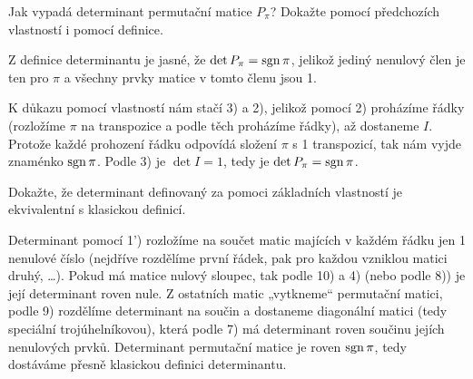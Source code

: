 \documentclass[12pt]{article}					%
\begin{document}
    \begin{priklad}[9.2]
        Jak vypadá determinant permutační matice $P_\pi$? Dokažte pomocí předchozích vlastností i pomocí definice.

        \begin{reseni}
            Z definice determinantu je jasné, že $\det P_\pi = \operatorname{sgn} \pi$, jelikož jediný nenulový člen je ten pro $\pi$ a všechny prvky matice v tomto členu jsou 1.

            K důkazu pomocí vlastností nám stačí 3) a 2), jelikož pomocí 2) proházíme řádky (rozložíme $\pi$ na transpozice a podle těch proházíme řádky), až dostaneme $I$. Protože každé prohození řádku odpovídá složení $\pi$ s 1 transpozicí, tak nám vyjde znaménko $\operatorname{sgn} \pi$. Podle 3) je $\det I = 1$, tedy je $\det P_\pi = \operatorname{sgn} \pi$.
        \end{reseni}
    \end{priklad}

    \begin{priklad}[9.3]
        Dokažte, že determinant definovaný za pomoci základních vlastností je ekvivalentní s klasickou definicí.

        \begin{dukazin}
            Determinant pomocí 1') rozložíme na součet matic majících v každém řádku jen 1 nenulové číslo (nejdříve rozdělíme první řádek, pak pro každou vzniklou matici druhý, …). Pokud má matice nulový sloupec, tak podle 10) a 4) (nebo podle 8)) je její determinant roven nule. Z ostatních matic „vytkneme“ permutační matici, podle 9) rozdělíme determinant na součin a dostaneme diagonální matici (tedy speciální trojúhelníkovou), která podle 7) má determinant roven součinu jejích nenulových prvků. Determinant permutační matice je roven $\operatorname{sgn} \pi$, tedy dostáváme přesně klasickou definici determinantu.
        \end{dukazin}
    \end{priklad}

\pagebreak
\end{document}
